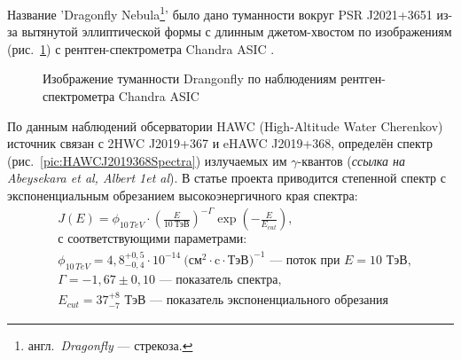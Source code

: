 \documentclass[magd,floatypics,numeref]{msudipl} %
\begin{document}
Название 'Dragonfly Nebula\footnote{англ.~\textit{Dragonfly} --- стрекоза.}' было дано туманности вокруг PSR J2021+3651 из-за вытянутой эллиптической формы с длинным джетом-хвостом по изображениям (рис.~\ref{pic:DFImage}\afterpage{\clearpage}) с рентген-спектрометра Chandra ASIC \cite{van2008rings}. 
\begin{figure}[b]
	\noindent{}
	\caption{Изображение туманности Drangonfly по наблюдениям рентген-спектрометра Chandra ASIC}
	\label{pic:DFImage}
\end{figure}

По данным наблюдений обсерватории HAWC (High-Altitude Water Cherenkov) источник связан с 2HWC J2019+367 и eHAWC J2019+368, определён спектр (рис.~\ref{pic:HAWCJ2019368Spectra}) \afterpage{\clearpage} излучаемых им $\gamma$-квантов (\textit{ссылка на Abeysekara et al, Albert 1et al}). В статье проекта приводится степенной спектр с экспоненциальным обрезанием высокоэнергичного  края спектра:
\[
\begin{aligned}
&J(E)=\phi_{10\,TeV} \cdot\left(\frac{E}{10~\text{ТэВ}}\right)^{-\Gamma} \exp \left(-\frac{E}{E_{cut}}\right),\\
&\text{с соответствующими параметрами:}\\
&\phi_{10\,TeV} = 4,\!8^{+0{,}5}_{-0{,}4}\cdot 10^{-14}~\text{($\text{см}^2\cdot \text{c}\cdot \text{ТэВ})^{-1}$ --- поток при $E = 10$~ТэВ},\\
&\Gamma=-1{,}67\pm 0,\!10 \text{ --- показатель спектра},\\
&E_{cut} = 37^{+8}_{-7} \text{ ТэВ --- показатель экспоненциального обрезания}
\end{aligned}
\]
\end{document}
